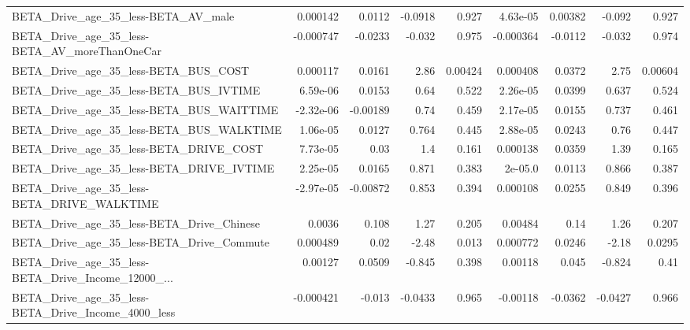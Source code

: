 \begin{tabular}{lrrrrrrrr}
BETA\_Drive\_age\_35\_less-BETA\_AV\_male                &    0.000142 &       0.0112 &  -0.0918 &    0.927 &   4.63e-05 &     0.00382 &       -0.092 &         0.927 \\
BETA\_Drive\_age\_35\_less-BETA\_AV\_moreThanOneCar      &   -0.000747 &      -0.0233 &   -0.032 &    0.975 &  -0.000364 &     -0.0112 &       -0.032 &         0.974 \\
BETA\_Drive\_age\_35\_less-BETA\_BUS\_COST               &    0.000117 &       0.0161 &     2.86 &  0.00424 &   0.000408 &      0.0372 &         2.75 &       0.00604 \\
BETA\_Drive\_age\_35\_less-BETA\_BUS\_IVTIME             &    6.59e-06 &       0.0153 &     0.64 &    0.522 &   2.26e-05 &      0.0399 &        0.637 &         0.524 \\
BETA\_Drive\_age\_35\_less-BETA\_BUS\_WAITTIME           &   -2.32e-06 &     -0.00189 &     0.74 &    0.459 &   2.17e-05 &      0.0155 &        0.737 &         0.461 \\
BETA\_Drive\_age\_35\_less-BETA\_BUS\_WALKTIME           &    1.06e-05 &       0.0127 &    0.764 &    0.445 &   2.88e-05 &      0.0243 &         0.76 &         0.447 \\
BETA\_Drive\_age\_35\_less-BETA\_DRIVE\_COST             &    7.73e-05 &         0.03 &      1.4 &    0.161 &   0.000138 &      0.0359 &         1.39 &         0.165 \\
BETA\_Drive\_age\_35\_less-BETA\_DRIVE\_IVTIME           &    2.25e-05 &       0.0165 &    0.871 &    0.383 &    2e-05.0 &      0.0113 &        0.866 &         0.387 \\
BETA\_Drive\_age\_35\_less-BETA\_DRIVE\_WALKTIME         &   -2.97e-05 &     -0.00872 &    0.853 &    0.394 &   0.000108 &      0.0255 &        0.849 &         0.396 \\
BETA\_Drive\_age\_35\_less-BETA\_Drive\_Chinese          &      0.0036 &        0.108 &     1.27 &    0.205 &    0.00484 &        0.14 &         1.26 &         0.207 \\
BETA\_Drive\_age\_35\_less-BETA\_Drive\_Commute          &    0.000489 &         0.02 &    -2.48 &    0.013 &   0.000772 &      0.0246 &        -2.18 &        0.0295 \\
BETA\_Drive\_age\_35\_less-BETA\_Drive\_Income\_12000\_... &     0.00127 &       0.0509 &   -0.845 &    0.398 &    0.00118 &       0.045 &       -0.824 &          0.41 \\
BETA\_Drive\_age\_35\_less-BETA\_Drive\_Income\_4000\_less &   -0.000421 &       -0.013 &  -0.0433 &    0.965 &   -0.00118 &     -0.0362 &      -0.0427 &         0.966 \\

\end{tabular}
